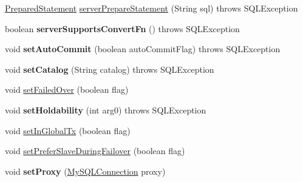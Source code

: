 \begin{DoxyCompactItemize}
\item 
\mbox{\hyperlink{classcom_1_1mysql_1_1jdbc_1_1_prepared_statement}{Prepared\+Statement}} \mbox{\hyperlink{classcom_1_1mysql_1_1jdbc_1_1_multi_host_my_s_q_l_connection_a7a111a6315de5d2c9b08f5e4d4f84fed}{server\+Prepare\+Statement}} (String sql)  throws S\+Q\+L\+Exception 
\item 
\mbox{\label{classcom_1_1mysql_1_1jdbc_1_1_multi_host_my_s_q_l_connection_a51538ded93d6889639650662e0bf5597}} 
boolean {\bfseries server\+Supports\+Convert\+Fn} ()  throws S\+Q\+L\+Exception 
\item 
\mbox{\label{classcom_1_1mysql_1_1jdbc_1_1_multi_host_my_s_q_l_connection_a2b7ff2b825825c0c4ed44476cf9c0275}} 
void {\bfseries set\+Auto\+Commit} (boolean auto\+Commit\+Flag)  throws S\+Q\+L\+Exception 
\item 
\mbox{\label{classcom_1_1mysql_1_1jdbc_1_1_multi_host_my_s_q_l_connection_a416705630b7c29723911aaa89fb34385}} 
void {\bfseries set\+Catalog} (String catalog)  throws S\+Q\+L\+Exception 
\item 
void \mbox{\hyperlink{classcom_1_1mysql_1_1jdbc_1_1_multi_host_my_s_q_l_connection_af950571e47bab54277504fca71cbefd5}{set\+Failed\+Over}} (boolean flag)
\item 
\mbox{\label{classcom_1_1mysql_1_1jdbc_1_1_multi_host_my_s_q_l_connection_abc57d37a3c7c56822de5f856904f6c82}} 
void {\bfseries set\+Holdability} (int arg0)  throws S\+Q\+L\+Exception 
\item 
void \mbox{\hyperlink{classcom_1_1mysql_1_1jdbc_1_1_multi_host_my_s_q_l_connection_ae2310c7ba07ef821c22538d1a4cc4c84}{set\+In\+Global\+Tx}} (boolean flag)
\item 
void \mbox{\hyperlink{classcom_1_1mysql_1_1jdbc_1_1_multi_host_my_s_q_l_connection_a87204976d451f0fa0c086fea3bc3be73}{set\+Prefer\+Slave\+During\+Failover}} (boolean flag)
\item 
\mbox{\label{classcom_1_1mysql_1_1jdbc_1_1_multi_host_my_s_q_l_connection_a2f366501fcba63c3184759f991ebae62}} 
void {\bfseries set\+Proxy} (\mbox{\hyperlink{interfacecom_1_1mysql_1_1jdbc_1_1_my_s_q_l_connection}{My\+S\+Q\+L\+Connection}} proxy)

\end{DoxyCompactItemize}
